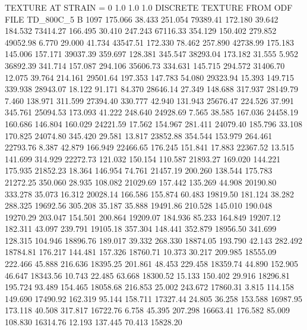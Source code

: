 TEXTURE AT STRAIN = 0
1.0   1.0   1.0
DISCRETE TEXTURE FROM ODF FILE TD_800C_5
B 1097
 175.066   38.433  251.054     79389.41
 172.180   39.642  184.532     73414.27
 166.495   30.410  247.243     67116.33
 354.129  150.402  279.852     49052.98
   6.770   29.000   41.734     43547.51
 172.330   78.462  257.890     42738.99
 175.183  145.006  157.171     39037.39
 359.697  128.381  345.547     38293.04
 173.182   31.555    5.952     36892.39
 341.714  157.087  294.106     35606.73
 334.631  145.715  294.572     31406.70
  12.075   39.764  214.161     29501.64
 197.353  147.783   54.080     29323.94
  15.393  149.715  339.938     28943.07
  18.122   91.171   84.370     28646.14
  27.349  148.688  317.937     28149.79
   7.460  138.971  311.599     27394.40
 330.777   42.940  131.943     25676.47
 224.526   37.991  345.761     25094.53
 173.093   41.222  248.640     24928.69
   7.565   38.585  167.036     24458.19
 160.686  146.804  160.029     24221.59
  17.562  154.967  281.411     24079.40
 185.796   33.108  170.825     24074.80
 345.420   29.581   13.817     23852.88
 354.544  153.979  264.461     22793.76
   8.387   42.879  166.949     22466.65
 176.245  151.841   17.883     22367.52
  13.515  141.699  314.929     22272.73
 121.032  150.154  110.587     21893.27
 169.020  144.221  175.935     21852.23
  18.364  146.954   74.761     21457.19
 200.260  138.544  175.783     21272.25
 350.060   28.935  108.082     21029.69
 157.442  135.269   44.908     20190.80
 333.278   35.073   16.312     20028.14
 166.586  155.874   60.483     19819.50
 181.124   38.282  288.325     19692.56
 305.208   35.187   35.888     19491.86
 210.528  145.010  190.048     19270.29
 203.047  154.501  200.864     19209.07
 184.936   85.233  164.849     19207.12
 182.311   43.097  239.791     19105.18
 357.304  148.441  352.879     18956.50
 341.699  128.315  104.946     18896.76
 189.017   39.332  268.330     18874.05
 193.790   42.143  282.492     18784.81
 176.217  144.481  157.326     18760.71
  10.373   30.217  209.985     18555.09
 222.466   45.888  216.636     18395.25
 201.861   48.453  229.458     18359.74
  44.890  152.905   46.647     18343.56
  10.743   22.485   63.668     18300.52
  15.133  150.402   29.916     18296.81
 195.724   93.489  154.465     18058.68
 216.853   25.002  243.672     17860.31
   3.815  114.158  149.690     17490.92
 162.319   95.144  158.711     17327.44
  24.805   36.258  153.588     16987.95
 173.118   40.508  317.817     16722.76
   6.758   45.395  207.298     16663.41
 176.582   85.009  108.830     16314.76
  12.193  137.445   70.413     15828.20
